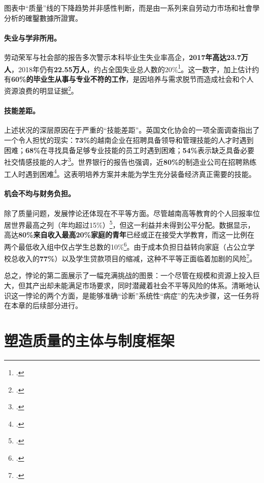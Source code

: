 图表中“质量”线的下降趋势并非感性判断，而是由一系列来自劳动力市场和社會學分析的確鑿數據所證實。

\paragraph{失业与学非所用。} 劳动荣军与社会部的报告多次警示本科毕业生失业率高企，\textbf{2017年高达23.7万人}，2018年仍有\textbf{22.55万人}，约占全国失业总人数的20\%\footcite{vietnamnews_unemployed_2017}。这一数字，加上估计约有\textbf{60\%的毕业生从事与专业不符的工作}，是因培养与需求脱节而造成社会和个人资源浪费的明显证据\footcite{britishcouncil_grad_employability_2021}。

\paragraph{技能差距。} 上述状况的深层原因在于严重的“技能差距”。英国文化协会的一项全面调查指出了一个令人担忧的现实：\textbf{73\%}的越南企业在招聘具备领导和管理技能的人才时遇到困难；\textbf{68\%}在寻找具备足够专业技能的员工时遇到困难；\textbf{54\%}表示缺乏具备必要社交情感技能的人才\footcite{britishcouncil_skills_gap_2021}。世界银行的报告也强调，近\textbf{80\%}的制造业公司在招聘熟练工人时遇到困难\footcite{worldbank_p178112}。这表明培养方案并未能为学生充分装备经济真正需要的技能。

\paragraph{机会不均与财务负担。} 除了质量问题，发展悖论还体现在不平等方面。尽管越南高等教育的个人回报率位居世界最高之列（年均超过15\%）\footcite{worldbank_improvingperformance_2020}，但这一利益并未得到公平分配。数据显示，高达\textbf{80\%来自收入最高20\%家庭的青年}已经或正在接受大学教育，而这一比例在两个最低收入组中仅占学生总数的10\%\footcite{worldbank_p178112}。由于成本负担日益转向家庭（占公立学校总收入的\textbf{77\%}）以及学生贷款项目的缩减，这种不平等正面临着加剧的风险\footcite{worldbank_p178112}。

总之，悖论的第二面展示了一幅充满挑战的图景：一个尽管在规模和资源上投入巨大，但其产出却未能满足市场要求，同时潜藏着社会不平等风险的体系。清晰地认识这一悖论的两个方面，是能够准确“诊断”系统性“病症”的先决步骤，这一任务将在本章的后续部分进行。





\section{塑造质量的主体与制度框架}
\label{sec:khung_the_che}

